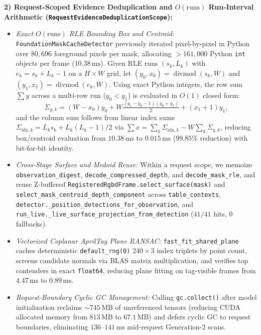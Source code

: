 \documentclass[10pt,journal]{IEEEtran}
\begin{document}
\textbf{2) Request-Scoped Evidence Deduplication and $O(\text{runs})$ Run-Interval Arithmetic (\texttt{RequestEvidenceDeduplicationScope}):}
\begin{itemize}
    \item \emph{Exact $O(\text{runs})$ RLE Bounding Box and Centroid:} \texttt{FoundationMaskCacheDetector} previously iterated pixel-by-pixel in Python over $80{,}696$ foreground pixels per mask, allocating $>161{,}000$ Python \texttt{int} objects per frame ($10.38\,\mathrm{ms}$). Given RLE runs $(s_k,L_k)$ with $e_k=s_k+L_k-1$ on a $H\times W$ grid, let $(y_0,x_0)=\operatorname{divmod}(s_k,W)$ and $(y_1,x_1)=\operatorname{divmod}(e_k,W)$. Using exact Python integers, the row sum $\sum y$ across a multi-row run ($y_0<y_1$) is evaluated in $O(1)$ closed form:
    \begin{equation}
        \Sigma_{y,k}=(W-x_0)y_0+W\tfrac{(y_1-y_0-1)(y_0+y_1)}{2}+(x_1+1)y_1,
        \label{eq:rle_sum_y}
    \end{equation}
    and the column sum follows from linear index sums $\Sigma_{\mathrm{idx},k}=L_k s_k+L_k(L_k-1)/2$ via $\sum x=\sum_k\Sigma_{\mathrm{idx},k}-W\sum_k\Sigma_{y,k}$, reducing box/centroid evaluation from $10.38\,\mathrm{ms}$ to $0.015\,\mathrm{ms}$ ($99.85\%$ reduction) with bit-for-bit identity.
    \item \emph{Cross-Stage Surface and Medoid Reuse:} Within a request scope, we memoize \texttt{observation\_digest}, \texttt{decode\_compressed\_depth}, and \texttt{decode\_mask\_rle}, and reuse Z-buffered \texttt{RegisteredRgbdFrame.select\_surface(mask)} and \texttt{select\_mask\_centroid\_depth\_component} across \texttt{table\_contexts}, \texttt{detector.\_position\_detections\_for\_observation}, and \texttt{run\_live.\_live\_surface\_projection\_from\_detection} ($41/41$ hits, $0$ fallbacks).
    \item \emph{Vectorized Coplanar AprilTag Plane RANSAC:} \texttt{fast\_fit\_shared\_plane} caches deterministic \texttt{default\_rng(0)} $240\times 3$ index triplets by point count, screens candidate normals via BLAS matrix multiplication, and verifies top contenders in exact \texttt{float64}, reducing plane fitting on tag-visible frames from $4.47\,\mathrm{ms}$ to $0.89\,\mathrm{ms}$.
    \item \emph{Request-Boundary Cyclic GC Management:} Calling \texttt{gc.collect()} after model initialization reclaims $\sim 745\,\mathrm{MB}$ of unreferenced tensors (reducing CUDA allocated memory from $813\,\mathrm{MB}$ to $67.1\,\mathrm{MB}$) and defers cyclic GC to request boundaries, eliminating $136$--$141\,\mathrm{ms}$ mid-request Generation-2 scans.
\end{itemize}
\end{document}
